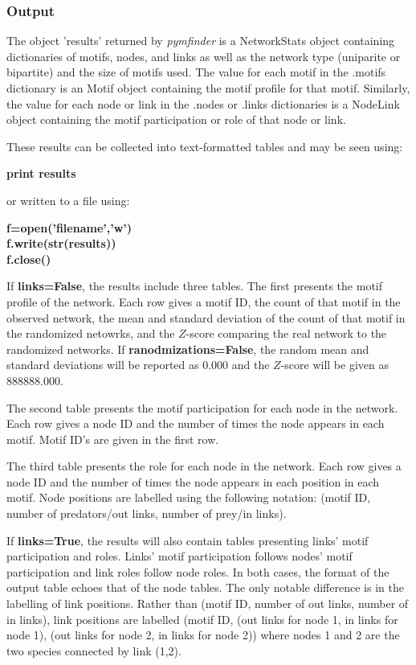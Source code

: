\documentclass[12pt]{article}
\begin{document}
		\subsubsection{Output}

			The object 'results' returned by \emph{pymfinder} is a NetworkStats object containing dictionaries of motifs, nodes, and links as well as the network type (uniparite or bipartite) and the size of motifs used. The value for each motif in the .motifs dictionary is an Motif object containing the motif profile for that motif. Similarly, the value for each node or link in the .nodes or .links dictionaries is a NodeLink object containing the motif participation or role of that node or link.


			These results can be collected into text-formatted tables and may be seen using:

			\textbf{print results}

			or written to a file using:

			\textbf{f=open('filename','w')\\
					f.write(str(results))\\
					f.close()}\\
			\medskip


			If \textbf{links=False}, the results include three tables. The first presents the motif profile of the network. Each row gives a motif ID, the count of that motif in the observed network, the mean and standard deviation of the count of that motif in the randomized netowrks, and the $Z$-score comparing the real network to the randomized networks. If \textbf{ranodmizations=False}, the random mean and standard deviations will be reported as 0.000 and the $Z$-score will be given as 888888.000.


			The second table presents the motif participation for each node in the network. Each row gives a node ID and the number of times the node appears in each motif. Motif ID's are given in the first row.


			The third table presents the role for each node in the network. Each row gives a node ID and the number of times the node appears in each position in each motif. Node positions are labelled using the following notation: (motif ID, number of predators/out links, number of prey/in links).


			If \textbf{links=True}, the results will also contain tables presenting links' motif participation and roles. Links' motif participation follows nodes' motif participation and link roles follow node roles. In both cases, the format of the output table echoes that of the node tables. The only notable difference is in the labelling of link positions. Rather than (motif ID, number of out links, number of in links), link positions are labelled (motif ID, (out links for node 1, in links for node 1), (out links for node 2, in links for node 2)) where nodes 1 and 2 are the two species connected by link (1,2).
\end{document}
